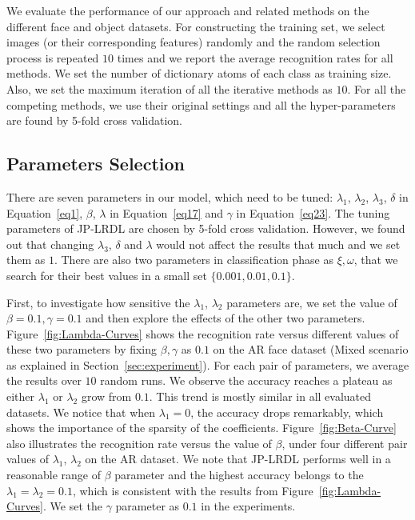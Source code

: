 \documentclass[journal]{IEEEtran}
\begin{document}
We evaluate the performance of our approach and related methods on the different face and object datasets. For constructing the training set, we select images (or their corresponding features) randomly and the random selection process is repeated $10$ times and we report the average recognition rates for all methods. We set the number of dictionary atoms of each class as training size. Also, we set the maximum iteration of all the iterative methods as $10$. For all the competing methods, we use their original settings and all the hyper-parameters are found by 5-fold cross validation.
\subsection{Parameters Selection}
There are seven parameters in our model, which need to be tuned: $\lambda_1$, $\lambda_2$, $\lambda_3$, $\delta$ in Equation~\eqref{eq1}, $\beta$, $\lambda$ in Equation~\eqref{eq17} and $\gamma$ in Equation~\eqref{eq23}. The tuning parameters of JP-LRDL are chosen by 5-fold cross validation. However, we found out that changing $\lambda_3$, $\delta$ and $\lambda$ would not affect the results that much and we set them as $1$. There are also two parameters in classification phase as $\xi, \omega$, that we search for their best values in a small set $\{0.001, 0.01,0.1\}$. 

First, to investigate how sensitive the $\lambda_1$, $\lambda_2$ parameters are, we set the value of $\beta=0.1, \gamma=0.1$ and then explore the effects of the other two parameters. Figure~\ref{fig:Lambda-Curves} shows the recognition rate versus different values of these two parameters by fixing $\beta,\gamma$ as $0.1$ on the AR face dataset (Mixed scenario as explained in Section~\ref{sec:experiment}). For each pair of parameters, we average the results over $10$ random runs. We observe the accuracy reaches a plateau as either $\lambda_1$ or $\lambda_2$ grow from $0.1$. This trend is mostly similar in all evaluated datasets. We notice that when $\lambda_1=0$, the accuracy drops remarkably, which shows the importance of the sparsity of the coefficients. 
Figure~\ref{fig:Beta-Curve} also illustrates the recognition rate versus the value of $\beta$, under four different pair values of $\lambda_1$, $\lambda_2$ on the AR dataset. We note that JP-LRDL performs well in a reasonable range of $\beta$ parameter and the highest accuracy belongs to the $\lambda_1 =\lambda_2=0.1$, which is consistent with the results from Figure~\ref{fig:Lambda-Curves}. We set the $\gamma$ parameter as $0.1$ in the experiments.
\end{document}

